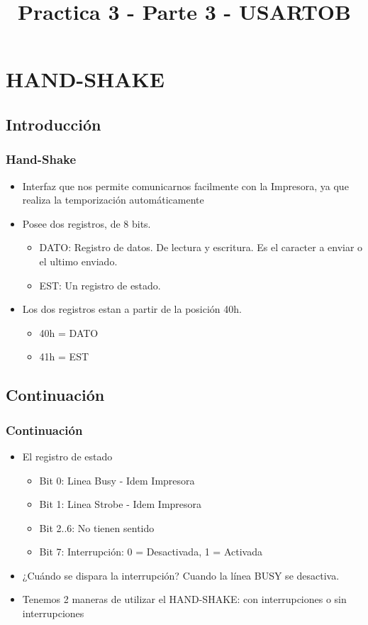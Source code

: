 \documentclass{beamer}
\title{Practica 3 - Parte 3 - USARTOB}
\begin{document}
\begin{frame}
\titlepage
\end{frame}

\section{HAND-SHAKE}
\subsection{Introducción}
\begin{frame}
\frametitle{Hand-Shake}
\begin{itemize}
 \item Interfaz que nos permite comunicarnos facilmente con la Impresora, ya que realiza la temporización automáticamente
 \item Posee dos registros, de 8 bits.
  \begin{itemize}
   \item DATO: Registro de datos. De lectura y escritura. Es el caracter a enviar o el ultimo enviado.
   \item EST: Un registro de estado.
  \end{itemize}
 \item Los dos registros estan a partir de la posición 40h. 
  \begin{itemize}
      \item 40h = DATO
      \item 41h = EST
\end{itemize}
\end{itemize}
\end{frame}

\subsection{Continuación}
\begin{frame}
\frametitle{Continuación}
\begin{itemize}
 \item El registro de estado 
 \begin{itemize}
   \item Bit 0: Linea Busy - Idem Impresora
   \item Bit 1: Linea Strobe - Idem Impresora
   \item Bit 2..6: No tienen sentido
   \item Bit 7: Interrupción: 0 = Desactivada, 1 = Activada
  \end{itemize}
 \item ¿Cuándo se dispara la interrupción? Cuando la línea BUSY se desactiva.
 \item Tenemos 2 maneras de utilizar el HAND-SHAKE: con interrupciones o sin interrupciones
\end{itemize}
\end{frame}
\end{document}
